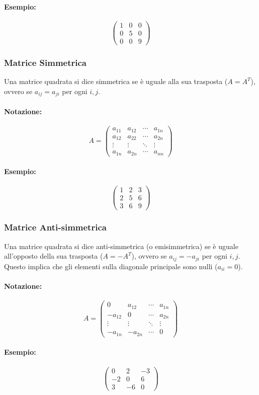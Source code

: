 \documentclass{article}
\begin{document}
\paragraph{Esempio:}
\[ \begin{pmatrix}
1 & 0 & 0 \\
0 & 5 & 0 \\
0 & 0 & 9
\end{pmatrix} \]

\subsubsection*{Matrice Simmetrica}
Una matrice quadrata si dice simmetrica se è uguale alla sua trasposta ($A = A^T$), ovvero se $a_{ij} = a_{ji}$ per ogni $i,j$.
\paragraph{Notazione:}
\[ A = \begin{pmatrix}
a_{11} & a_{12} & \cdots & a_{1n} \\
a_{12} & a_{22} & \cdots & a_{2n} \\
\vdots & \vdots & \ddots & \vdots \\
a_{1n} & a_{2n} & \cdots & a_{nn}
\end{pmatrix} \]
\paragraph{Esempio:}
\[ \begin{pmatrix}
1 & 2 & 3 \\
2 & 5 & 6 \\
3 & 6 & 9
\end{pmatrix} \]

\subsubsection*{Matrice Anti-simmetrica}
Una matrice quadrata si dice anti-simmetrica (o emisimmetrica) se è uguale all'opposto della sua trasposta ($A = -A^T$), ovvero se $a_{ij} = -a_{ji}$ per ogni $i,j$. Questo implica che gli elementi sulla diagonale principale sono nulli ($a_{ii} = 0$).
\paragraph{Notazione:}
\[ A = \begin{pmatrix}
0 & a_{12} & \cdots & a_{1n} \\
-a_{12} & 0 & \cdots & a_{2n} \\
\vdots & \vdots & \ddots & \vdots \\
-a_{1n} & -a_{2n} & \cdots & 0
\end{pmatrix} \]
\paragraph{Esempio:}
\[ \begin{pmatrix}
0 & 2 & -3 \\
-2 & 0 & 6 \\
3 & -6 & 0
\end{pmatrix} \]
\end{document}
